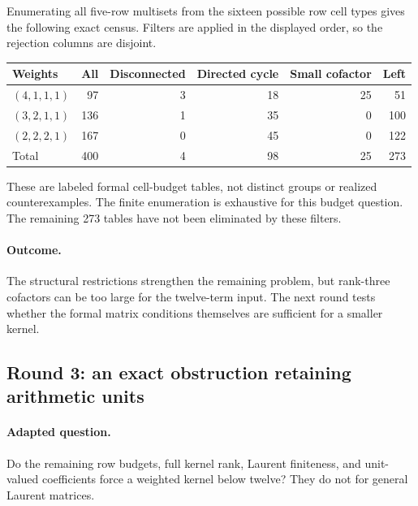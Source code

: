 \documentclass[11pt,a4paper,oneside]{report}
\theoremstyle{definition}
\theoremstyle{remark}
\begin{document}
Enumerating all five-row multisets from the sixteen possible row
cell types gives the following exact census. Filters are applied in
the displayed order, so the rejection columns are disjoint.
\begin{center}
\small
\begin{tabular}{@{}lrrrrr@{}}
\toprule
Weights & All & Disconnected & Directed cycle & Small cofactor & Left\\
\midrule
$(4,1,1,1)$ &97&3&18&25&51\\
$(3,2,1,1)$ &136&1&35&0&100\\
$(2,2,2,1)$ &167&0&45&0&122\\
\midrule
Total &400&4&98&25&273\\
\bottomrule
\end{tabular}
\end{center}
These are labeled formal cell-budget tables, not distinct groups or
realized counterexamples. The finite enumeration is exhaustive for
this budget question. The remaining 273 tables have not been
eliminated by these filters.

\paragraph{Outcome.}
The structural restrictions strengthen the remaining problem, but
rank-three cofactors can be too large for the twelve-term input.
The next round tests whether the formal matrix conditions themselves
are sufficient for a smaller kernel.

\subsection{Round 3: an exact obstruction retaining arithmetic units}

\paragraph{Adapted question.}
Do the remaining row budgets, full kernel rank, Laurent finiteness,
and unit-valued coefficients force a weighted kernel below twelve?
They do not for general Laurent matrices.
\end{document}
